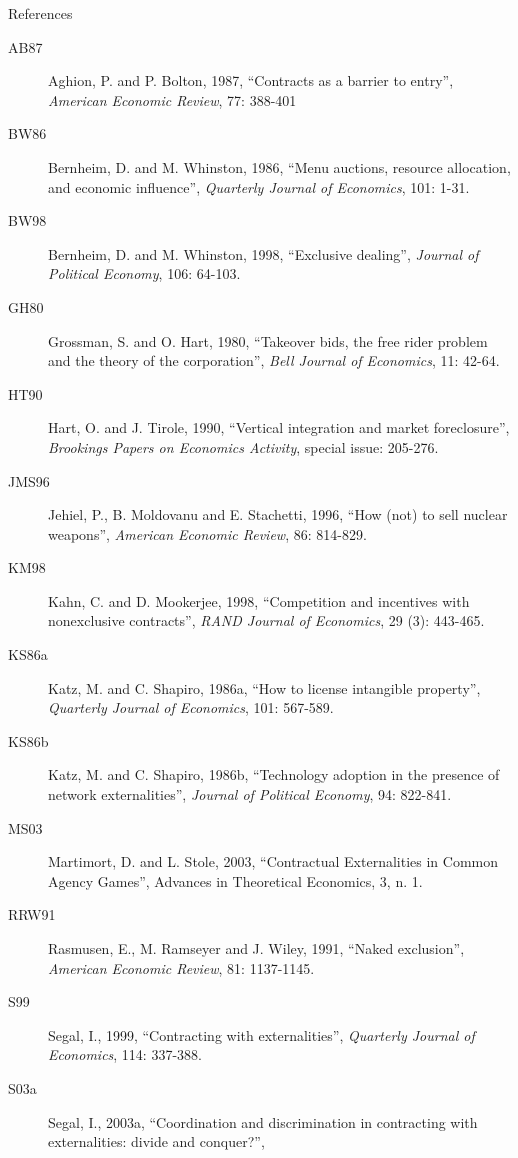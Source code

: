 \documentclass[11pt,english]{beamer}
\begin{document}
\begin{frame}[allowframebreaks]{References}
  \begin{description}
  \item[AB87] Aghion, P. and P. Bolton, 1987, ``Contracts as a barrier
    to entry'', \emph{American Economic Review}, 77: 388-401
  \item[BW86] Bernheim, D. and M. Whinston, 1986, ``Menu auctions,
    resource allocation, and economic influence'', \emph{Quarterly
      Journal of Economics}, 101: 1-31.
  \item[BW98] Bernheim, D. and M. Whinston, 1998, ``Exclusive dealing'',
    \emph{Journal of Political Economy}, 106: 64-103.
  \item[GH80] Grossman, S. and O. Hart, 1980, ``Takeover bids, the
    free rider problem and the theory of the corporation'', \emph{Bell
      Journal of Economics}, 11: 42-64.
  \item[HT90] Hart, O. and J. Tirole, 1990, ``Vertical integration and
    market foreclosure'', \emph{Brookings Papers on Economics
      Activity}, special issue: 205-276.
  \item[JMS96] Jehiel, P., B. Moldovanu and E. Stachetti, 1996, ``How
    (not) to sell nuclear weapons'', \emph{American Economic Review},
    86: 814-829.
  \item[KM98] Kahn, C. and D. Mookerjee, 1998, ``Competition and
    incentives with nonexclusive contracts'', \emph{RAND Journal of
      Economics}, 29 (3): 443-465.
  \item[KS86a] Katz, M. and C. Shapiro, 1986a, ``How to license
    intangible property'', \emph{Quarterly Journal of Economics}, 101: 567-589.
  \item[KS86b] Katz, M. and C. Shapiro, 1986b, ``Technology adoption
    in the presence of network externalities'', \emph{Journal of
      Political Economy}, 94: 822-841.
  \item[MS03] Martimort, D. and L. Stole, 2003, ``Contractual
    Externalities in Common Agency Games'', Advances in Theoretical
    Economics, 3, n. 1.
  \item[RRW91] Rasmusen, E., M. Ramseyer and J. Wiley, 1991, ``Naked
    exclusion'', \emph{American Economic Review}, 81: 1137-1145.
  \item[S99] Segal, I., 1999, ``Contracting with externalities'',
    \emph{Quarterly Journal of Economics}, 114: 337-388.
  \item[S03a] Segal, I., 2003a, ``Coordination and discrimination in
    contracting with externalities: divide and conquer?'',

\end{description}
\end{frame}
\end{document}
